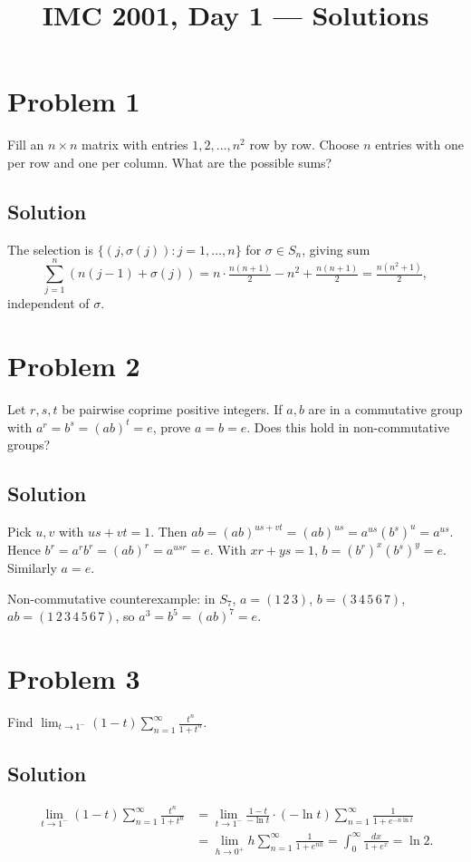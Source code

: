\documentclass{article}
\title{IMC 2001, Day 1 --- Solutions}
\begin{document}
\maketitle

\section*{Problem 1}
Fill an $n\times n$ matrix with entries $1,2,\dots,n^2$ row by row. Choose $n$ entries with one per row and one per column. What are the possible sums?

\subsection*{Solution}
The selection is $\{(j,\sigma(j)) : j=1,\dots,n\}$ for $\sigma\in S_n$, giving sum
\[\sum_{j=1}^n (n(j-1)+\sigma(j)) = n\cdot\tfrac{n(n+1)}{2} - n^2 + \tfrac{n(n+1)}{2} = \tfrac{n(n^2+1)}{2},\]
independent of $\sigma$.

\section*{Problem 2}
Let $r,s,t$ be pairwise coprime positive integers. If $a,b$ are in a commutative group with $a^r=b^s=(ab)^t=e$, prove $a=b=e$. Does this hold in non-commutative groups?

\subsection*{Solution}
Pick $u,v$ with $us+vt=1$. Then $ab=(ab)^{us+vt}=(ab)^{us}=a^{us}(b^s)^u=a^{us}$. Hence $b^r = a^r b^r = (ab)^r = a^{usr} = e$. With $xr+ys=1$, $b=(b^r)^x(b^s)^y = e$. Similarly $a=e$.

Non-commutative counterexample: in $S_7$, $a=(1\,2\,3)$, $b=(3\,4\,5\,6\,7)$, $ab=(1\,2\,3\,4\,5\,6\,7)$, so $a^3=b^5=(ab)^7=e$.

\section*{Problem 3}
Find $\displaystyle\lim_{t\to 1^-}(1-t)\sum_{n=1}^\infty \frac{t^n}{1+t^n}$.

\subsection*{Solution}
\begin{align*}
\lim_{t\to 1^-}(1-t)\sum_{n=1}^\infty \frac{t^n}{1+t^n} &= \lim_{t\to 1^-}\frac{1-t}{-\ln t}\cdot(-\ln t)\sum_{n=1}^\infty\frac{1}{1+e^{-n\ln t}}\\
&= \lim_{h\to 0^+} h\sum_{n=1}^\infty \frac{1}{1+e^{nh}} = \int_0^\infty \frac{dx}{1+e^x} = \ln 2.
\end{align*}
\end{document}
